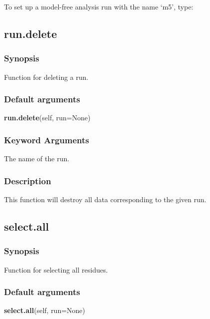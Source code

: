 To set up a model-free analysis run with the name `m5', type:




\newpage

\subsection{run.delete}


\subsubsection{Synopsis}

Function for deleting a run.

\subsubsection{Default arguments}

\textsf{\textbf{run.delete}(self, run=None)}


\subsubsection{Keyword Arguments}

  The name of the run.

\subsubsection{Description}

This function will destroy all data corresponding to the given run.


\newpage

\subsection{select.all}


\subsubsection{Synopsis}

Function for selecting all residues.

\subsubsection{Default arguments}

\textsf{\textbf{select.all}(self, run=None)}


